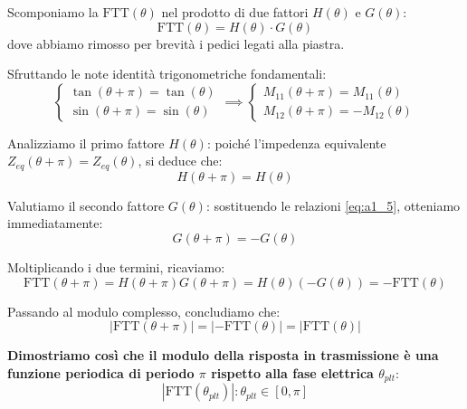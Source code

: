 Scomponiamo la $\text{FTT}(\theta)$ nel prodotto di due fattori $H(\theta)$ e $G(\theta)$:
\begin{equation}
    \text{FTT}(\theta) = H(\theta) \cdot G(\theta)
    \label{eq:a1_4}
\end{equation}
dove abbiamo rimosso per brevità i pedici legati alla piastra.

Sfruttando le note identità trigonometriche fondamentali:
\begin{equation}
    \begin{cases} \tan(\theta + \pi) = \tan(\theta) \\ \sin(\theta + \pi) = \sin(\theta) \end{cases} \implies
    \begin{cases} M_{11}(\theta + \pi) = M_{11}(\theta) \\ M_{12}(\theta + \pi) = -M_{12}(\theta) \end{cases}
    \label{eq:a1_5}
\end{equation}

Analizziamo il primo fattore $H(\theta)$: poiché l'impedenza equivalente $Z_{eq}(\theta + \pi) = Z_{eq}(\theta)$, si deduce che:
\begin{equation}
    H(\theta + \pi) = H(\theta)
    \label{eq:a1_6}
\end{equation}

Valutiamo il secondo fattore $G(\theta)$: sostituendo le relazioni \cref{eq:a1_5}, otteniamo immediatamente:
\begin{equation}
    G(\theta + \pi) = -G(\theta)
    \label{eq:a1_7}
\end{equation}

Moltiplicando i due termini, ricaviamo:
\begin{equation}
    \text{FTT}(\theta + \pi) = H(\theta + \pi) G(\theta + \pi) = H(\theta) (-G(\theta)) = -\text{FTT}(\theta)
    \label{eq:a1_8}
\end{equation}

Passando al modulo complesso, concludiamo che:
\begin{equation}
    |\text{FTT}(\theta + \pi)| = |-\text{FTT}(\theta)| = |\text{FTT}(\theta)|
    \label{eq:a1_9}
\end{equation}

\textbf{Dimostriamo così che il modulo della risposta in trasmissione è una funzione periodica di periodo $\pi$ rispetto alla fase elettrica $\theta_{plt}$}:
\begin{equation}
    |\text{FTT}(\theta_{plt})|: \theta_{plt} \in [0, \pi]
    \label{eq:a1_10}
\end{equation}

